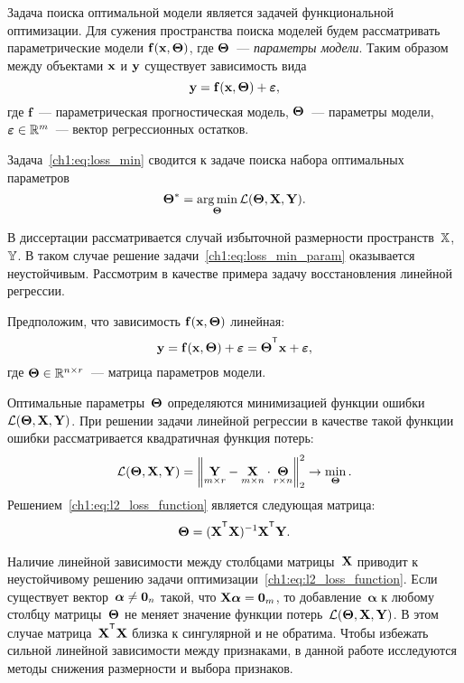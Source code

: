 \documentclass[11pt, a5paper]{dissert}
\begin{document}
Задача поиска оптимальной модели является задачей функциональной оптимизации. 
Для сужения пространства поиска моделей будем рассматривать параметрические модели $\mathbf{f}(\mathbf{x}, \boldsymbol{\Theta})$, где $\boldsymbol{\Theta}$~--- \textit{параметры модели}. 
Таким образом между объектами $\mathbf{x}$ и $\mathbf{y}$ существует зависимость вида
\begin{equation}
	\mathbf{y} = \mathbf{f}(\mathbf{x}, \boldsymbol{\Theta}) + \boldsymbol{\varepsilon},
	\label{ch1:eq:reg_model}
\end{equation}
где $\mathbf{f}$~--- параметрическая прогностическая модель, $\boldsymbol{\Theta}$~--- параметры модели, $\boldsymbol{\varepsilon} \in \mathbb{R}^{m}$~--- вектор регрессионных остатков. 

Задача~\eqref{ch1:eq:loss_min} сводится к задаче поиска набора оптимальных параметров
\begin{equation}
	\boldsymbol{\Theta}^* = \mathop{\arg \min}\limits_{\boldsymbol{\Theta}} \mathcal{L}(\boldsymbol{\Theta}, \mathbf{X}, \mathbf{Y}).
	\label{ch1:eq:loss_min_param}
\end{equation}

В диссертации рассматривается случай избыточной размерности пространств~$\mathbb{X}$, $\mathbb{Y}$. 
В таком случае решение задачи~\eqref{ch1:eq:loss_min_param} оказывается неустойчивым. 
Рассмотрим в качестве примера задачу восстановления линейной регрессии.

Предположим, что зависимость $\mathbf{f}(\mathbf{x}, \boldsymbol{\Theta})$ линейная:
\begin{equation}
	\by = \mathbf{f}(\bx, \bTheta) + \bepsilon = \bTheta^{\T} \bx+ \bepsilon,
	\label{ch1:eq:lin_reg_model}
\end{equation}
\noindent где $\boldsymbol{\Theta} \in \mathbb{R}^{n \times r}$~--- матрица параметров модели.

Оптимальные параметры~$\boldsymbol{\Theta}$ определяются минимизацией функции ошибки $\mathcal{L}(\boldsymbol{\Theta}, \mathbf{X}, \mathbf{Y})$.
При решении задачи линейной регрессии в качестве такой функции ошибки рассматривается квадратичная функция потерь:
\begin{equation}
	\mathcal{L}(\boldsymbol{\Theta}, \mathbf{X}, \mathbf{Y}) = {\left\| \underset{m \times r}{\mathbf{Y}}  - \underset{m \times n}{\mathbf{X}} \cdot \underset{r \times n}{\boldsymbol{\Theta}} \right\| }_2^2 \rightarrow\min_{\boldsymbol{\Theta}}.
	\label{ch1:eq:l2_loss_function}
\end{equation}
Решением~\eqref{ch1:eq:l2_loss_function} является следующая матрица:
\begin{equation*}
	\bTheta = (\bX^{\T} \bX)^{-1} \bX^{\T} \bY.
\end{equation*}

Наличие линейной зависимости между столбцами матрицы~$\mathbf{X}$ приводит к неустойчивому решению задачи оптимизации~\eqref{ch1:eq:l2_loss_function}.
Если существует вектор~$\boldsymbol{\alpha} \neq \boldsymbol{0}_n$ такой, что $\mathbf{X} \boldsymbol{\alpha}= \boldsymbol{0}_m$, то добавление~$\boldsymbol{\alpha}$ к любому столбцу матрицы~$\boldsymbol{\Theta}$ не меняет значение функции потерь~$\mathcal{L}(\boldsymbol{\Theta}, \mathbf{X}, \mathbf{Y})$.
В этом случае матрица~$\bX^{\T} \bX$ близка к сингулярной и не обратима.
Чтобы избежать сильной линейной зависимости между признаками, в данной работе исследуются методы снижения размерности и выбора признаков.
\end{document}
